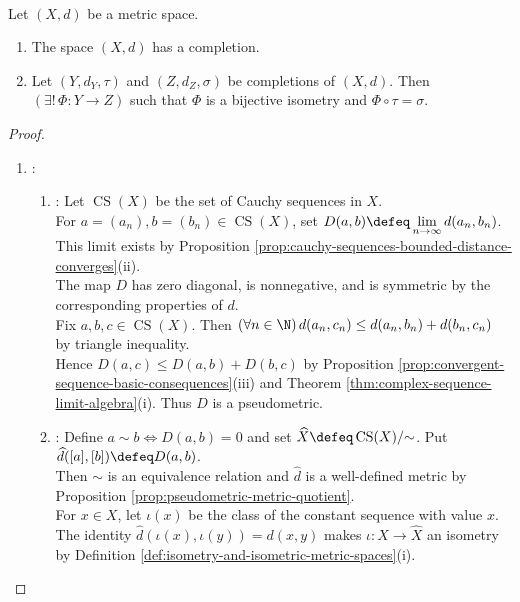 \begin{theorem} \label{thm:metric-completion-existence-uniqueness} \\
Let $(X,d)$ be a metric space.
\begin{enumerate}[label=(\roman*)]
\setlength{\itemsep}{0pt}
\item The space $(X,d)$ has a completion.
\item Let $(Y,d_Y,\tau)$ and $(Z,d_Z,\sigma)$ be completions of $(X,d)$. Then $(\exists!\,\Phi:Y\to Z)$ such that $\Phi$ is a bijective isometry and $\Phi\circ\tau=\sigma$.
\end{enumerate}
\begin{proof}
\begin{enumerate}[label=(\roman*)]
\setlength{\itemsep}{0pt}
\item {}:
\begin{enumerate}[label=(\alph*)]
\setlength{\itemsep}{0pt}
\item {}: Let $\operatorname{CS}(X)$ be the set of Cauchy sequences in $X$.\\
For $a=(a_n),b=(b_n)\in\operatorname{CS}(X)$, set $D(a,b)\defeq\lim\limits_{n\to\infty}d(a_n,b_n)$. This limit exists by Proposition \ref{prop:cauchy-sequences-bounded-distance-converges}(ii).\\
The map $D$ has zero diagonal, is nonnegative, and is symmetric by the corresponding properties of $d$.\\
Fix $a,b,c\in\operatorname{CS}(X)$. Then $(\forall n\in\N)\,d(a_n,c_n)\leq d(a_n,b_n)+d(b_n,c_n)$ by triangle inequality.\\
Hence $D(a,c)\leq D(a,b)+D(b,c)$ by Proposition \ref{prop:convergent-sequence-basic-consequences}(iii) and Theorem \ref{thm:complex-sequence-limit-algebra}(i). Thus $D$ is a pseudometric.
\item {}: Define $a\sim b\Longleftrightarrow D(a,b)=0$ and set $\widehat{X}\defeq\operatorname{CS}(X)/{\sim}$. Put $\widehat{d}([a],[b])\defeq D(a,b)$.\\
Then $\sim$ is an equivalence relation and $\widehat{d}$ is a well-defined metric by Proposition \ref{prop:pseudometric-metric-quotient}.\\
For $x\in X$, let $\iota(x)$ be the class of the constant sequence with value $x$.\\
The identity $\widehat{d}(\iota(x),\iota(y))=d(x,y)$ makes $\iota:X\to\widehat{X}$ an isometry by Definition \ref{def:isometry-and-isometric-metric-spaces}(i).

\end{enumerate}
\end{enumerate}
\end{proof}
\end{theorem}
